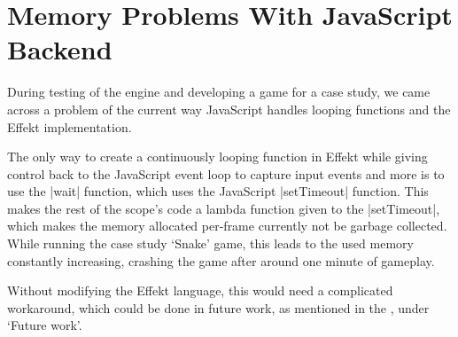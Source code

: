 \section{Memory Problems With JavaScript Backend}\label{sec:memoryproblem}

During testing of the engine and developing a game for a case study, we came across a problem of the current way JavaScript handles looping functions and the Effekt implementation.

The only way to create a continuously looping function in Effekt while giving control back to the JavaScript event loop to capture input events and more is to use the |wait| function, which uses the JavaScript |setTimeout| function. This makes the rest of the scope's code a lambda function given to the |setTimeout|, which makes the memory allocated per-frame currently not be garbage collected. While running the case study `Snake' game, this leads to the used memory constantly increasing, crashing the game after around one minute of gameplay.

Without modifying the Effekt language, this would need a complicated workaround, which could be done in future work, as mentioned in the , under `Future work'.
